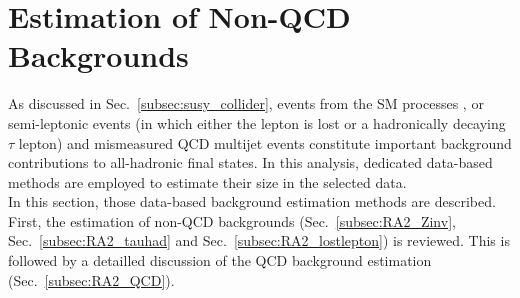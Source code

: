 \section{Estimation of Non-QCD Backgrounds}
\label{sec:RA2_Non-QCD}
As discussed in Sec.~\ref{subsec:susy_collider}, events from the SM processes \ZInvJets, \WJets or semi-leptonic \ttbar events (in which either the lepton is lost or a hadronically decaying $\tau$ lepton) and mismeasured QCD multijet events constitute important background contributions to all-hadronic final states. In this analysis, dedicated data-based methods are employed to estimate their size in the selected data. \\
In this section, those data-based background estimation methods are described. First, the estimation of non-QCD backgrounds (Sec.~\ref{subsec:RA2_Zinv}, Sec.~\ref{subsec:RA2_tauhad} and Sec.~\ref{subsec:RA2_lostlepton}) is reviewed. This is followed by a detailled discussion of the QCD background estimation (Sec.~\ref{subsec:RA2_QCD}). 

